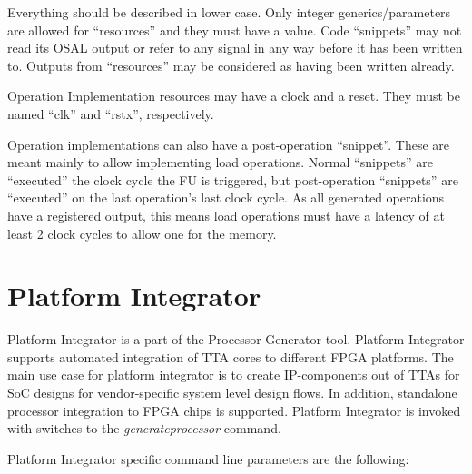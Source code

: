 \documentclass[a4paper,twoside]{tceusermanual}
\begin{document}
Everything should be described in lower case. Only integer
generics/parameters are allowed for ``resources'' and they must have a
value. Code ``snippets'' may not read its OSAL output or refer to any
signal in any way before it has been written to. Outputs from
``resources'' may be considered as having been written already.

Operation Implementation resources may have a clock and a reset.
They must be named ``clk'' and ``rstx'', respectively.

Operation implementations can also have a post-operation
``snippet''. These are meant mainly to allow implementing load
operations. Normal ``snippets'' are ``executed'' the clock cycle the FU
is triggered, but post-operation ``snippets'' are ``executed'' on the
last operation's last clock cycle. As all generated operations have a
registered output, this means load operations must have a latency of
at least 2 clock cycles to allow one for the memory.



\section{Platform Integrator}
\label{sec:platformIntegrator}

Platform Integrator is a part of the Processor Generator tool. Platform
Integrator supports automated integration of TTA cores to different
FPGA platforms. The main use case for platform integrator is to
create IP-components out of TTAs for SoC designs for vendor-specific system
level design flows. In addition, standalone processor integration to FPGA
chips is supported. Platform Integrator is invoked
with switches to the \textit{generateprocessor} command.

Platform Integrator specific command line parameters are the following:
\end{document}
